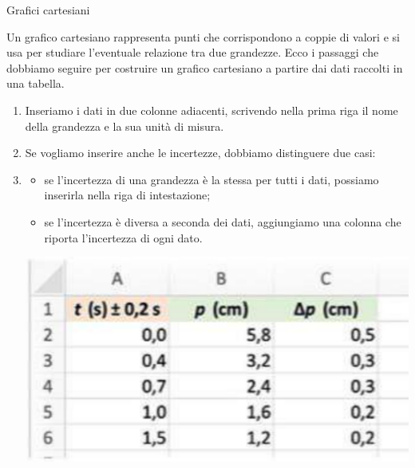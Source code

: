 \documentclass[12pt,a4paper,oneside]{book}
\makeatletter
\newcounter{testexample} %
\renewcommand{\subsubsection}{\@startsection {subsubsection}{3}{\z@}
{-2ex \@plus -0.1ex \@minus -.2ex}
{.2ex \@plus.2ex }
{\color[rgb]{0.141,0.596,0.749}\normalfont\small\sffamily\bfseries}}
\theoremstyle{esercizio}
\makeatother
\begin{document}
\subsubsection{Grafici cartesiani}

Un grafico cartesiano rappresenta punti che corrispondono a coppie di valori e si usa per studiare l'eventuale relazione tra due grandezze.
Ecco i passaggi che dobbiamo seguire per costruire un grafico cartesiano a partire dai dati raccolti in una tabella.
\begin{enumerate}
    \item Inseriamo i dati in due colonne adiacenti, scrivendo nella prima
    riga il nome della grandezza e la sua unità di misura. 
    \item Se vogliamo inserire anche le incertezze, dobbiamo distinguere due casi: 
    \item \begin{itemize}
    \item se l'incertezza di una grandezza è la stessa per tutti i dati, 
    possiamo inserirla nella riga di intestazione;

\item se l'incertezza è diversa a seconda dei dati, aggiungiamo una colonna
che riporta l'incertezza di ogni dato.
    \end{itemize}

    \begin{testexample}

    
        
         \begin{minipage}{\linewidth}
            \centering
            \includegraphics[scale=0.2]{img/barre-libre.png} 
            \label{fig:barrelibre}\end{minipage}
        \end{testexample}


\end{enumerate}
\end{document}
